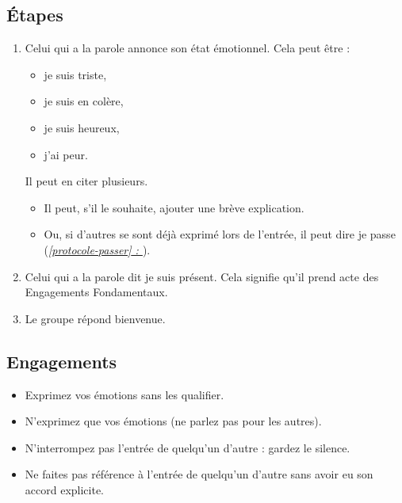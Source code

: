 \documentclass[paper=6in:9in,pagesize=pdftex,headinclude=on,footinclude=on,12pt]{scrbook}
\newcommand*{\fullref}[1]{\textit{\hyperref[{#1}]{\autoref*{#1} : \nameref*{#1}}}}
\begin{document}
\subsection{Étapes}
\begin{enumerate}
	\item Celui qui a la parole annonce son état émotionnel. Cela peut être :
	      \begin{itemize}
		    \item \og{}je suis triste\fg{},
		    \item \og{}je suis en colère\fg{},
		    \item \og{}je suis heureux\fg{},
		    \item \og{}j'ai peur\fg{}.
	      \end{itemize}
	      Il peut en citer plusieurs.
	      \begin{itemize}
	      	\item Il peut, s'il le souhaite, ajouter une brève explication.
	      	\item Ou, si d'autres se sont déjà exprimé lors de l'entrée, il peut dire \og{}je passe\fg{} (\fullref{protocole-passer}).
	      \end{itemize}
	\item Celui qui a la parole dit \og{}je suis présent\fg{}. Cela signifie qu'il prend acte des Engagements Fondamentaux.
	\item Le groupe répond \og{}bienvenue\fg{}.
\end{enumerate}

\subsection{Engagements}
\begin{itemize}
	\item Exprimez vos émotions sans les qualifier.
	\item N'exprimez que vos émotions (ne parlez pas pour les autres).
	\item N'interrompez pas l'entrée de quelqu'un d'autre : gardez le silence.
	\item Ne faites pas référence à l'entrée de quelqu'un d'autre sans avoir eu son accord explicite.
\end{itemize}
\end{document}
